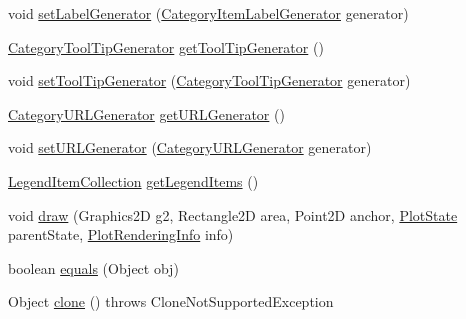 \begin{DoxyCompactItemize}
\item 
void \mbox{\hyperlink{classorg_1_1jfree_1_1chart_1_1plot_1_1_spider_web_plot_a9910d82d876e9229115d36b0bdbc8174}{set\+Label\+Generator}} (\mbox{\hyperlink{interfaceorg_1_1jfree_1_1chart_1_1labels_1_1_category_item_label_generator}{Category\+Item\+Label\+Generator}} generator)
\item 
\mbox{\hyperlink{interfaceorg_1_1jfree_1_1chart_1_1labels_1_1_category_tool_tip_generator}{Category\+Tool\+Tip\+Generator}} \mbox{\hyperlink{classorg_1_1jfree_1_1chart_1_1plot_1_1_spider_web_plot_a265ccacbd0b27a4f909fcbd07e58303b}{get\+Tool\+Tip\+Generator}} ()
\item 
void \mbox{\hyperlink{classorg_1_1jfree_1_1chart_1_1plot_1_1_spider_web_plot_ad4eaa6c6e790c66b4146ee7f0a1fd455}{set\+Tool\+Tip\+Generator}} (\mbox{\hyperlink{interfaceorg_1_1jfree_1_1chart_1_1labels_1_1_category_tool_tip_generator}{Category\+Tool\+Tip\+Generator}} generator)
\item 
\mbox{\hyperlink{interfaceorg_1_1jfree_1_1chart_1_1urls_1_1_category_u_r_l_generator}{Category\+U\+R\+L\+Generator}} \mbox{\hyperlink{classorg_1_1jfree_1_1chart_1_1plot_1_1_spider_web_plot_a5ff43ff8150727508cf5789a00491db6}{get\+U\+R\+L\+Generator}} ()
\item 
void \mbox{\hyperlink{classorg_1_1jfree_1_1chart_1_1plot_1_1_spider_web_plot_a8400df465e80c5fb7ba648adaf51bff5}{set\+U\+R\+L\+Generator}} (\mbox{\hyperlink{interfaceorg_1_1jfree_1_1chart_1_1urls_1_1_category_u_r_l_generator}{Category\+U\+R\+L\+Generator}} generator)
\item 
\mbox{\hyperlink{classorg_1_1jfree_1_1chart_1_1_legend_item_collection}{Legend\+Item\+Collection}} \mbox{\hyperlink{classorg_1_1jfree_1_1chart_1_1plot_1_1_spider_web_plot_ab325d38f739c0d3816f3f43f21200635}{get\+Legend\+Items}} ()
\item 
void \mbox{\hyperlink{classorg_1_1jfree_1_1chart_1_1plot_1_1_spider_web_plot_abf5cfbcc013ea362693b1328aab66da4}{draw}} (Graphics2D g2, Rectangle2D area, Point2D anchor, \mbox{\hyperlink{classorg_1_1jfree_1_1chart_1_1plot_1_1_plot_state}{Plot\+State}} parent\+State, \mbox{\hyperlink{classorg_1_1jfree_1_1chart_1_1plot_1_1_plot_rendering_info}{Plot\+Rendering\+Info}} info)
\item 
boolean \mbox{\hyperlink{classorg_1_1jfree_1_1chart_1_1plot_1_1_spider_web_plot_a1e619412f5faddd8ba53cb7191bdd05b}{equals}} (Object obj)
\item 
Object \mbox{\hyperlink{classorg_1_1jfree_1_1chart_1_1plot_1_1_spider_web_plot_a6b0cf8431f53fa75fdc18ce163659579}{clone}} ()  throws Clone\+Not\+Supported\+Exception 
\end{DoxyCompactItemize}
